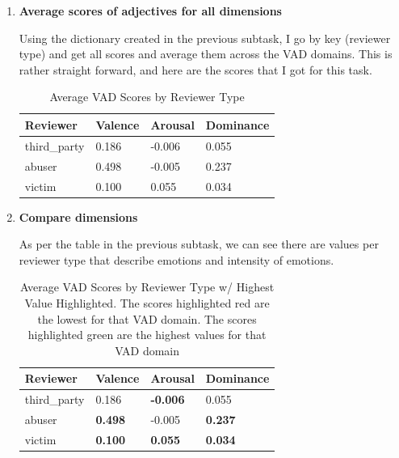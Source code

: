 \documentclass[12pt]{article}
\begin{document}
\begin{enumerate}
    \item \textbf{Average scores of adjectives for all dimensions}
    
    Using the dictionary created in the previous subtask, I go by key (reviewer type) and get all scores and average them
    across the VAD domains. This is rather straight forward, and here are the scores that I got for this task.

    \begin{table}[H]
        \centering
        \renewcommand{\arraystretch}{1.4}
        \begin{tabular}{p{4cm} p{3cm} p{3cm} p{3cm}}
            \toprule
            \rowcolor{tableheader}
            \color{white}\textbf{Reviewer} & \color{white}\textbf{Valence} & \color{white}\textbf{Arousal} & \color{white}\textbf{Dominance} \\
            \midrule
            \rowcolor{rowalt} third\_party & 0.186 & -0.006 & 0.055 \\
                              abuser & 0.498 & -0.005 & 0.237 \\
            \rowcolor{rowalt} victim & 0.100 & 0.055 & 0.034 \\
            \bottomrule
        \end{tabular}
        \caption{Average VAD Scores by Reviewer Type}
        \label{tab:vad-averages}
    \end{table}

    \item \textbf{Compare dimensions}
    
    As per the table in the previous subtask, we can see there are values per reviewer type that 
    describe emotions and intensity of emotions. 

    \begin{table}[H]
        \centering
        \renewcommand{\arraystretch}{1.4}
        \begin{tabular}{p{4cm} p{3cm} p{3cm} p{3cm}}
            \toprule
            \rowcolor{tableheader}
            \color{white}\textbf{Reviewer} & \color{white}\textbf{Valence} & \color{white}\textbf{Arousal} & \color{white}\textbf{Dominance} \\
            \midrule
            \rowcolor{rowalt} third\_party & 0.186 & \cellcolor{red!13}\textbf{-0.006} & 0.055 \\
                              abuser & \cellcolor{green!13}\textbf{0.498} & -0.005 & \cellcolor{green!13}\textbf{0.237} \\
            \rowcolor{rowalt} victim & \cellcolor{red!13}\textbf{0.100} & \cellcolor{green!13}\textbf{0.055} & \cellcolor{red!13}\textbf{0.034} \\
            \bottomrule
        \end{tabular}
        \caption{Average VAD Scores by Reviewer Type w/ Highest Value Highlighted. 
        The scores highlighted red are the lowest for that VAD domain. 
        The scores highlighted green are the highest values for that VAD domain}
        \label{tab:vad-averages-highlighted}
    \end{table}


\end{enumerate}
\end{document}
